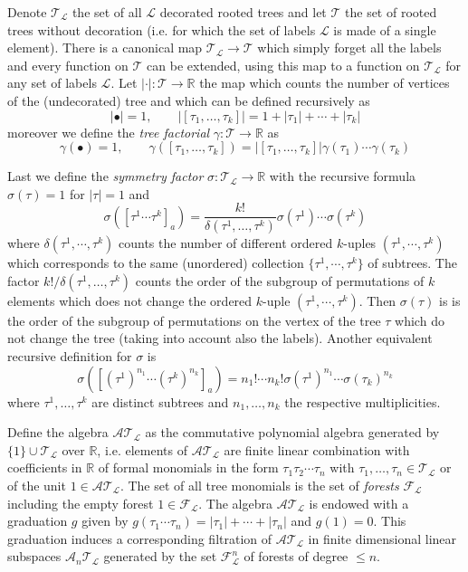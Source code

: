 \documentclass[a4paper,11pt,reqno]{article}
\newcommand{\1}{{\bf 1}}
\newcommand{\RR}{\mathbb{R}}
\newcommand{\FF}{\mathcal{F}}
\newcommand{\LL}{\mathcal{L}}
\newcommand{\cl}{\mathcal L}
\newcommand{\TT}{\mathcal{T}}
\newcommand{\cA}{\mathcal{A}}
\begin{document}
Denote $\TT_\cl$ the set of all $\cl$
decorated rooted trees and let $\TT$ the set of rooted trees without
decoration (i.e. for which the set of labels $\cl$ is made of a single
element). There is a canonical map $\TT_\cl \to \TT$ which simply
forget all the labels and every function on $\TT$ can be extended,
using this map to a function on $\TT_\cl$ for any set of labels
$\cl$. 
Let $|\cdot| : \TT \to \RR$ the map which counts the
number of vertices of the (undecorated) tree and which can be defined
recursively as
$$
|\bullet | = 1, \qquad |[\tau_1,\dots,\tau_k]| = 1+|\tau_1|+\cdots+|\tau_k|
$$
moreover we define the \emph{tree factorial} $\gamma: \TT \to \RR$ as
$$
\gamma(\bullet) = 1, \qquad \gamma([\tau_1,\dots,\tau_k]) =
|[\tau_1,\dots,\tau_k]| \gamma(\tau_1) \cdots \gamma(\tau_k)
$$



Last we define the \emph{symmetry factor} $\sigma : \TT_\cl \to \RR$ with the
recursive formula $\sigma(\tau) = 1$ for $|\tau| = 1$ and
\begin{equation}
  \label{eq:sigma-prop}
\sigma([\tau^1 \cdots \tau^k]_a) = \frac{k!}{\delta(\tau^1,\dots,\tau^k)} \sigma(\tau^1) \cdots \sigma(\tau^k)  
\end{equation}
where $\delta(\tau^1,\cdots,\tau^{k})$ counts the number of different ordered $k$-uples $(\tau^1,\cdots,\tau^{k})$ which corresponds to the same (unordered) collection  $\{\tau^1,\cdots,\tau^{k}\}$ of subtrees.
The factor $k!/\delta(\tau^1,\dots,\tau^k)$ counts the order of the
subgroup of permutations of $k$ elements which does not change the
ordered $k$-uple $(\tau^1,\cdots,\tau^{k})$. Then $\sigma(\tau)$ is
 is the order of the subgroup of permutations on the vertex of
the tree $\tau$ which do not change the tree (taking into account also
the labels). Another equivalent recursive definition for $\sigma$ is
$$
\sigma([(\tau^1)^{n_1}\cdots(\tau^k)^{n_k}]_a) = n_1!\cdots n_k!
\sigma(\tau^1)^{n_1}\cdots \sigma(\tau_k)^{n_k}
$$
where $\tau^1,\dots,\tau^k$ are distinct subtrees and $n_1,\dots,n_k$
the respective multiplicities.



Define the algebra $\cA \TT_\cl$ as the commutative polynomial algebra
generated by $\{1\}\cup \TT_\cl$ over $\RR$, i.e. elements of $\cA \TT_\cl$ are
finite linear combination with coefficients in $\RR$ of formal monomials in the form $\tau_1
\tau_2 \cdots \tau_n$ with $\tau_1,\dots,\tau_n \in \TT_\cl$ or of the
unit $1\in \cA\TT_\cl$. The set of all tree monomials is the set of
\emph{forests} $\FF_\cl$ including the empty forest $1 \in \FF_\LL$. The algebra $\cA \TT_\cl$
 is endowed with a graduation $g$ given  by $g(\tau_1
\cdots \tau_n) = |\tau_1|+\cdots+|\tau_n|$ and $g(1) = 0$. This graduation induces a
corresponding filtration of $\cA \TT_\cl$ in finite dimensional linear
subspaces $\cA_n \TT_\cl$ generated by the set $\FF_\cl^n$ of forests of degree $\le n$.
\end{document}
